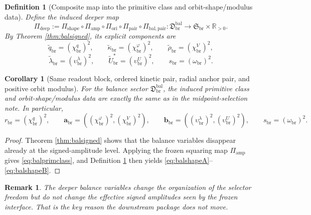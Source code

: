 \documentclass[11pt]{article}
\newcommand{\RespShapeReadout}{\widetilde q_{\mathrm{br}}}
\newcommand{\RespShapeCov}{\widetilde\kappa_{\mathrm{br}}}
\newcommand{\RespShapeRelax}{\widetilde\rho_{\mathrm{br}}}
\newcommand{\RespShapeWell}{\widetilde\lambda_{\mathrm{br}}}
\newcommand{\RespShapeEq}{\widetilde U_{\mathrm{br}}^{\ast}}
\newcommand{\ShapeTuple}{\mathfrak S_{\mathrm{br}}}
\newcommand{\ScaleMod}{s_{\mathrm{br}}}
\newcommand{\PrimRead}{r_{\mathrm{br}}}
\newcommand{\PrimKinetic}{\bm a_{\mathrm{br}}}
\newcommand{\PrimAnchor}{\bm b_{\mathrm{br}}}
\newcommand{\AmpMap}{\Pi_{\mathrm{amp}}}
\newcommand{\PrimMap}{\Pi_{\mathrm{shape}}}
\newcommand{\AbsReadAmp}{\chi_{\mathrm{br}}^{q}}
\newcommand{\AbsCovAmp}{\chi_{\mathrm{br}}^{\varphi}}
\newcommand{\AbsRelaxAmp}{\chi_{\mathrm{br}}^{V}}
\newcommand{\AbsWellAmp}{\upsilon_{\mathrm{br}}^{\lambda}}
\newcommand{\AbsEqAmp}{\upsilon_{\mathrm{br}}^{U}}
\newcommand{\AbsScaleAmp}{\omega_{\mathrm{br}}}
\newcommand{\OriginMap}{\Pi_{\mathrm{ori}}}
\newcommand{\DeepMap}{\Pi_{\mathrm{deep}}}
\newcommand{\PairMap}{\Pi_{\mathrm{pair}}}
\newcommand{\MidBalanceSector}{\mathfrak D_{\mathrm{br}}^{\mathrm{bal}}}
\newcommand{\BalPairMap}{\Pi_{\mathrm{bal,pair}}}
\newtheorem{definition}{Definition}
\newtheorem{remark}{Remark}
\newtheorem{corollary}{Corollary}
\begin{document}
\begin{definition}[Composite map into the primitive class and orbit-shape/modulus data]
\label{def:deepmap}
Define the induced deeper map
\begin{equation}
\DeepMap
:=
\PrimMap\circ\AmpMap\circ\OriginMap\circ\PairMap\circ\BalPairMap
:
\MidBalanceSector\longrightarrow\ShapeTuple\times\mathbb R_{>0}.
\label{eq:deepmap}
\end{equation}
By Theorem \ref{thm:balsigned}, its explicit components are
\begin{equation}
\RespShapeReadout=(\AbsReadAmp)^{2},
\qquad
\RespShapeCov=(\AbsCovAmp)^{2},
\qquad
\RespShapeRelax=(\AbsRelaxAmp)^{2},
\label{eq:balshapeA}
\end{equation}
\begin{equation}
\RespShapeWell=(\AbsWellAmp)^{2},
\qquad
\RespShapeEq=(\AbsEqAmp)^{2},
\qquad
\ScaleMod=(\AbsScaleAmp)^{2}.
\label{eq:balshapeB}
\end{equation}
\end{definition}

\begin{corollary}[Same readout block, ordered kinetic pair, radial anchor pair, and positive orbit modulus]
\label{cor:balblockmap}
For the balance sector \(\MidBalanceSector\), the induced primitive class and orbit-shape/modulus data are exactly the same as in the midpoint-selection note. In particular,
\begin{equation}
\PrimRead=(\AbsReadAmp)^{2},
\qquad
\PrimKinetic=((\AbsCovAmp)^{2},(\AbsRelaxAmp)^{2}),
\qquad
\PrimAnchor=((\AbsWellAmp)^{2},(\AbsEqAmp)^{2}),
\qquad
\ScaleMod=(\AbsScaleAmp)^{2}.
\label{eq:balprimclass}
\end{equation}
\end{corollary}

\begin{proof}
Theorem \ref{thm:balsigned} shows that the balance variables disappear already at the signed-amplitude level. Applying the frozen squaring map \(\AmpMap\) gives \eqref{eq:balprimclass}, and Definition \ref{def:deepmap} then yields \eqref{eq:balshapeA}--\eqref{eq:balshapeB}.
\end{proof}

\begin{remark}
The deeper balance variables change the organization of the selector freedom but do not change the effective signed amplitudes seen by the frozen interface. That is the key reason the downstream package does not move.
\end{remark}
\end{document}
